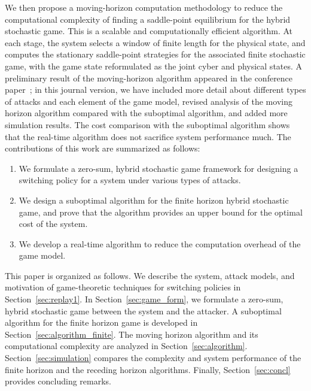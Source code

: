 We then propose a moving-horizon computation methodology to reduce the computational complexity of finding a saddle-point equilibrium for the hybrid stochastic game. This is a scalable and computationally efficient algorithm. At each stage, the system selects a window of finite length for the physical state, and computes the stationary saddle-point strategies for the associated finite stochastic game, with the game state reformulated as the joint cyber and physical states. A preliminary result of the moving-horizon algorithm appeared in the conference paper~\cite{game_cdc14}; in this journal version, we have included more detail about different types of attacks and each element of the game model, revised analysis of the moving horizon algorithm compared with the suboptimal algorithm, and added more simulation results. The cost comparison with the suboptimal algorithm shows that the real-time algorithm does not sacrifice system performance much. The contributions of this work are summarized as follows: 
\begin{enumerate}
\item We formulate a zero-sum, hybrid stochastic game framework for designing a switching policy for a system under various types of attacks. 
\item We design a suboptimal algorithm for the finite horizon hybrid stochastic game, and prove that the algorithm provides an upper bound for the optimal cost of the system. 
\item We develop a real-time algorithm to reduce the computation overhead of the game model.   
\end{enumerate}

This paper is organized as follows. We describe the system, attack models, and motivation of game-theoretic techniques for switching policies in Section~\ref{sec:replay1}. In Section~\ref{sec:game_form}, we formulate a zero-sum,  hybrid stochastic game between the system and the attacker. A suboptimal algorithm for the finite horizon game is developed in Section~\ref{sec:algorithm_finite}. The moving horizon algorithm and its computational complexity are analyzed in Section~\ref{sec:algorithm}. Section~\ref{sec:simulation} compares the complexity and system performance of the finite horizon and the receding horizon algorithms. Finally, Section~\ref{sec:concl} provides concluding remarks.

\iffalse
When the sequence of game strategies converges, the state transition probability of the game converges, and we leverage the stability analysis of Markov jump systems~(\cite{delay_mlj}) to check system stability.
 \cite{taxreplay} presents a taxonomy of replay attacks on cryptographic protocols.
that uses a moving window to select a sequence of physical state information, and computes a stationary saddle-point equilibrium strategy with the state being a joint cyber and physical state 
\fi